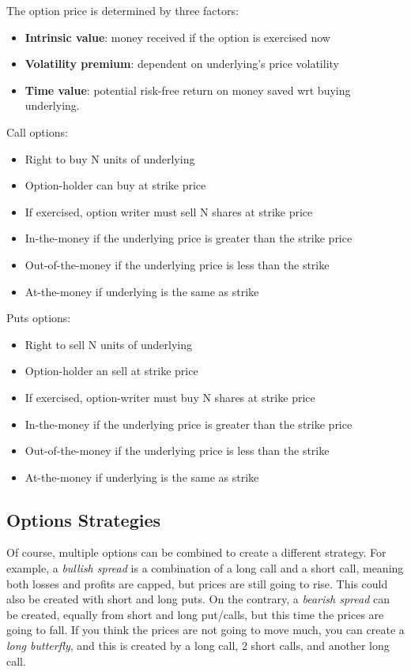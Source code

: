 \documentclass[11pt,a4paper,titlepage,dvipsnames,cmyk]{scrartcl}
\begin{document}
The option price is determined by three factors:
\begin{itemize}
    \item \textbf{Intrinsic value}: money received if the option is exercised now
    \item \textbf{Volatility premium}: dependent on underlying's price volatility
    \item \textbf{Time value}: potential risk-free return on money saved wrt buying underlying.
\end{itemize}

Call options:
\begin{itemize}
    \item Right to buy N units of underlying
    \item Option-holder can buy at strike price
    \item If exercised, option writer must sell N shares at strike price
    \item In-the-money if the underlying price is greater than the strike price
    \item Out-of-the-money if the underlying price is less than the strike
    \item At-the-money if underlying is the same as strike
\end{itemize}

Puts options:
\begin{itemize}
    \item Right to sell N units of underlying
    \item Option-holder an sell at strike price
    \item If exercised, option-writer must buy N shares at strike price
    \item In-the-money if the underlying price is greater than the strike price
    \item Out-of-the-money if the underlying price is less than the strike
    \item At-the-money if underlying is the same as strike
\end{itemize}

\subsection{Options Strategies}
Of course, multiple options can be combined to create a different strategy. For example, a \textit{bullish spread} is a combination of a long call and a short call, meaning both losses and profits are capped, but prices are still going to rise. This could also be created with short and long puts. On the contrary, a \textit{bearish spread} can be created, equally from short and long put/calls, but this time the prices are going to fall. If you think the prices are not going to move much, you can create a \textit{long butterfly}, and this is created by a long call, 2 short calls, and another long call.
\end{document}

